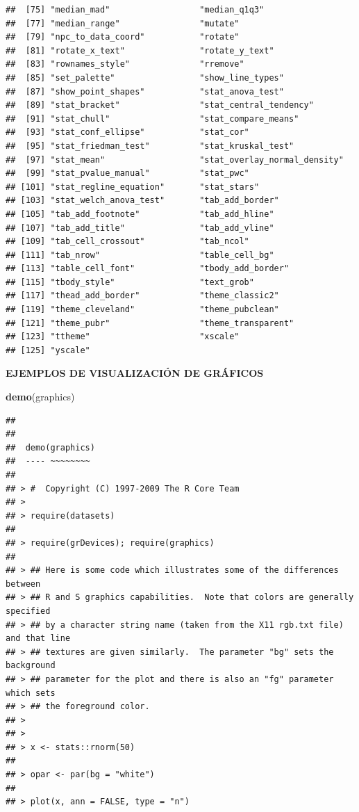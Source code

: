 \documentclass[
]{book}
\newenvironment{Shaded}{\begin{snugshade}}{\end{snugshade}}
\newcommand{\FunctionTok}[1]{\textcolor[rgb]{0.13,0.29,0.53}{\textbf{#1}}}
\newcommand{\NormalTok}[1]{#1}
\begin{document}
\begin{verbatim}
##  [75] "median_mad"                  "median_q1q3"                
##  [77] "median_range"                "mutate"                     
##  [79] "npc_to_data_coord"           "rotate"                     
##  [81] "rotate_x_text"               "rotate_y_text"              
##  [83] "rownames_style"              "rremove"                    
##  [85] "set_palette"                 "show_line_types"            
##  [87] "show_point_shapes"           "stat_anova_test"            
##  [89] "stat_bracket"                "stat_central_tendency"      
##  [91] "stat_chull"                  "stat_compare_means"         
##  [93] "stat_conf_ellipse"           "stat_cor"                   
##  [95] "stat_friedman_test"          "stat_kruskal_test"          
##  [97] "stat_mean"                   "stat_overlay_normal_density"
##  [99] "stat_pvalue_manual"          "stat_pwc"                   
## [101] "stat_regline_equation"       "stat_stars"                 
## [103] "stat_welch_anova_test"       "tab_add_border"             
## [105] "tab_add_footnote"            "tab_add_hline"              
## [107] "tab_add_title"               "tab_add_vline"              
## [109] "tab_cell_crossout"           "tab_ncol"                   
## [111] "tab_nrow"                    "table_cell_bg"              
## [113] "table_cell_font"             "tbody_add_border"           
## [115] "tbody_style"                 "text_grob"                  
## [117] "thead_add_border"            "theme_classic2"             
## [119] "theme_cleveland"             "theme_pubclean"             
## [121] "theme_pubr"                  "theme_transparent"          
## [123] "ttheme"                      "xscale"                     
## [125] "yscale"
\end{verbatim}

\textbf{EJEMPLOS DE VISUALIZACIÓN DE GRÁFICOS}

\begin{Shaded}
\begin{Highlighting}[]
\FunctionTok{demo}\NormalTok{(graphics)}
\end{Highlighting}
\end{Shaded}

\begin{verbatim}
## 
## 
##  demo(graphics)
##  ---- ~~~~~~~~
## 
## > #  Copyright (C) 1997-2009 The R Core Team
## > 
## > require(datasets)
## 
## > require(grDevices); require(graphics)
## 
## > ## Here is some code which illustrates some of the differences between
## > ## R and S graphics capabilities.  Note that colors are generally specified
## > ## by a character string name (taken from the X11 rgb.txt file) and that line
## > ## textures are given similarly.  The parameter "bg" sets the background
## > ## parameter for the plot and there is also an "fg" parameter which sets
## > ## the foreground color.
## > 
## > 
## > x <- stats::rnorm(50)
## 
## > opar <- par(bg = "white")
## 
## > plot(x, ann = FALSE, type = "n")
\end{verbatim}
\end{document}
